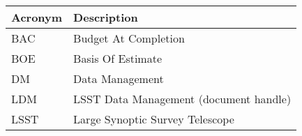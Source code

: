 \addtocounter{table}{-1}
\begin{longtable}{|l|p{}|}\hline
\textbf{Acronym} & \textbf{Description}  \\\hline

BAC & Budget At Completion \\\hline
BOE & Basis Of Estimate \\\hline
DM & Data Management \\\hline
LDM & LSST Data Management (document handle) \\\hline
LSST & Large Synoptic Survey Telescope \\\hline
\end{longtable}
